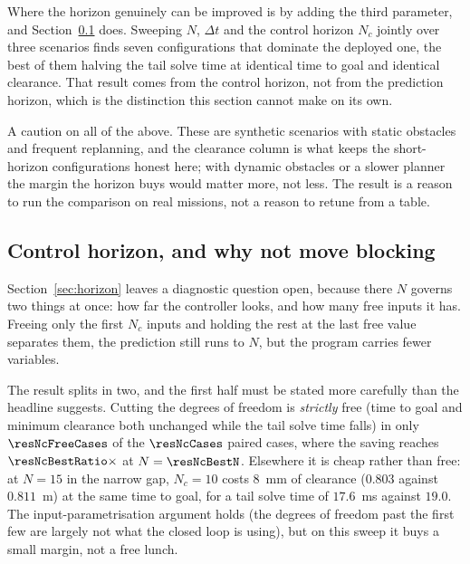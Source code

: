 \documentclass[11pt,a4paper]{article}
\newcommand{\Ninput}{N_c}
\begin{document}
Where the horizon genuinely can be improved is by adding the third parameter, and Section~\ref{sec:nc}
does. Sweeping $N$, $\Delta t$ and the control horizon $\Ninput$ jointly over three scenarios finds seven
configurations that dominate the deployed one, the best of them halving the tail solve time at identical time
to goal and identical clearance. That result comes from the control horizon, not from the prediction horizon,
which is the distinction this section cannot make on its own.

A caution on all of the above. These are synthetic scenarios with static obstacles and frequent replanning,
and the clearance column is what keeps the short-horizon configurations honest here; with dynamic obstacles
or a slower planner the margin the horizon buys would matter more, not less. The result is a reason to run
the comparison on real missions, not a reason to retune from a table.

\subsection{Control horizon, and why not move blocking}
\label{sec:nc}

Section~\ref{sec:horizon} leaves a diagnostic question open, because there $N$ governs two things at once:
how far the controller looks, and how many free inputs it has. Freeing only the first $\Ninput$ inputs and
holding the rest at the last free value separates them, the prediction still runs to $N$, but the program
carries fewer variables.

\begin{table}[htbp]
  \centering
  \small
  \caption{%
  Closed-loop outcome against the control horizon at fixed prediction horizon.}
  \label{res:tab:nc}
\end{table}

The result splits in two, and the first half must be stated more carefully than the headline suggests.
Cutting the degrees of freedom is \emph{strictly} free (time to goal and minimum clearance both unchanged
while the tail solve time falls) in only $\resNcFreeCases$ of the $\resNcCases$ paired cases, where the
saving reaches $\resNcBestRatio\times$ at $N=\resNcBestN$. Elsewhere it is cheap rather than free: at
$N=15$ in the narrow gap, $\Ninput=10$ costs $8$~mm of clearance ($0.803$ against $0.811$~m) at the same time
to goal, for a tail solve time of $17.6$~ms against $19.0$. The input-parametrisation argument holds (the
degrees of freedom past the first few are largely not what the closed loop is using), but on this sweep it
buys a small margin, not a free lunch.
\end{document}
